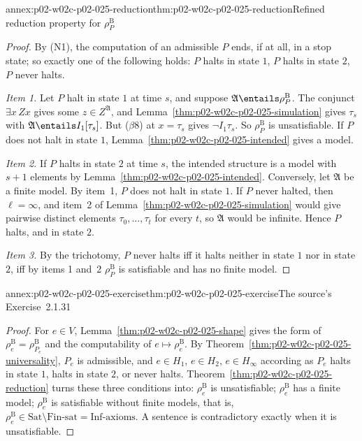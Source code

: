 \begin{annexitem}{annex:p02-w02c-p02-025-reduction}{thm:p02-w02c-p02-025-reduction}{Refined reduction property for \(\rho^{\mathrm B}_P\)}
\begin{proof}
By (N1), the computation of an admissible \(P\) ends, if at all, in a stop
state; so exactly one of the following holds: \(P\) halts in state \(1\), \(P\)
halts in state \(2\), \(P\) never halts.

\emph{Item 1.}  Let \(P\) halt in state \(1\) at time \(s\), and suppose
\(\mathfrak A\entails\rho^{\mathrm B}_P\).  The conjunct \(\exists x\,Zx\) gives
some \(z\in Z^{\mathfrak A}\), and
Lemma~\ref{thm:p02-w02c-p02-025-simulation} gives \(\tau_s\) with
\(\mathfrak A\entails I_1[\tau_s]\).  But (\(\beta\)8) at \(x=\tau_s\) gives
\(\neg I_1\tau_s\).  So \(\rho^{\mathrm B}_P\) is unsatisfiable.  If \(P\) does not
halt in state \(1\), Lemma~\ref{thm:p02-w02c-p02-025-intended} gives a model.

\emph{Item 2.}  If \(P\) halts in state \(2\) at time \(s\), the intended structure
is a model with \(s+1\) elements by
Lemma~\ref{thm:p02-w02c-p02-025-intended}.  Conversely, let \(\mathfrak A\) be a
finite model.  By item~1, \(P\) does not halt in state \(1\).  If \(P\) never
halted, then \(\ell=\infty\), and item~2 of
Lemma~\ref{thm:p02-w02c-p02-025-simulation} would give pairwise distinct
elements \(\tau_0,\ldots,\tau_t\) for every \(t\), so \(\mathfrak A\) would be
infinite.  Hence \(P\) halts, and in state \(2\).

\emph{Item 3.}  By the trichotomy, \(P\) never halts iff it halts neither in
state \(1\) nor in state \(2\), iff by items 1 and~2 \(\rho^{\mathrm B}_P\) is
satisfiable and has no finite model.
\end{proof}
\end{annexitem}

\begin{annexitem}{annex:p02-w02c-p02-025-exercise}{thm:p02-w02c-p02-025-exercise}{The source's Exercise~2.1.31}
\begin{proof}
For \(e\in V\), Lemma~\ref{thm:p02-w02c-p02-025-shape} gives the form of
\(\rho^{\mathrm B}_e=\rho^{\mathrm B}_{P_e}\) and the computability of
\(e\mapsto\rho^{\mathrm B}_e\).  By
Theorem~\ref{thm:p02-w02c-p02-025-universality}, \(P_e\) is admissible, and
\(e\in H_1\), \(e\in H_2\), \(e\in H_\infty\) according as \(P_e\) halts in state
\(1\), halts in state \(2\), or never halts.  Theorem~\ref{thm:p02-w02c-p02-025-reduction}
turns these three conditions into: \(\rho^{\mathrm B}_e\) is unsatisfiable;
\(\rho^{\mathrm B}_e\) has a finite model; \(\rho^{\mathrm B}_e\) is satisfiable
without finite models, that is,
\(\rho^{\mathrm B}_e\in\mathrm{Sat}\setminus\mathrm{Fin\text{-}sat}=
\mathrm{Inf\text{-}axioms}\).  A sentence is contradictory exactly when it is
unsatisfiable.
\end{proof}
\end{annexitem}

